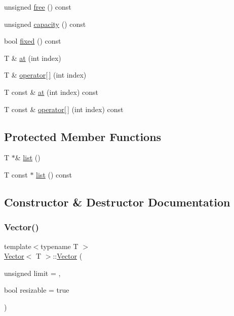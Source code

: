 \begin{DoxyCompactItemize}
unsigned \hyperlink{classVector_a1c11aef701f6eb3194946594d064af09}{free} () const
\item 
unsigned \hyperlink{classVector_a30435b1635ae160705f53755d25a407b}{capacity} () const
\item 
bool \hyperlink{classVector_ada65b076d4102d21479cdb00fec6b6a1}{fixed} () const
\item 
T \& \hyperlink{classVector_a0a53d8de64ae7cc1e388df4e46ab06bf}{at} (int index)
\item 
T \& \hyperlink{classVector_a2054758707c08325ef160fd4dfc48ff7}{operator\mbox{[}$\,$\mbox{]}} (int index)
\item 
T const  \& \hyperlink{classVector_a2539a2d9ca64fd4e400d1bdc23dc292c}{at} (int index) const
\item 
T const  \& \hyperlink{classVector_a491327d90df15af7ee79c6705f005491}{operator\mbox{[}$\,$\mbox{]}} (int index) const
\end{DoxyCompactItemize}
\subsection*{Protected Member Functions}
\begin{DoxyCompactItemize}
\item 
T $\ast$\& \hyperlink{classVector_aad3f85e26470d99139e3f96053bdacc4}{list} ()
\item 
T const  $\ast$ \hyperlink{classVector_a2aaf129778179680e5932d96aa5471eb}{list} () const
\end{DoxyCompactItemize}


\subsection{Constructor \& Destructor Documentation}
\mbox{\label{classVector_a2d2738e562188d3c4e08c3fc7075dc0a}} 
\subsubsection{\texorpdfstring{Vector()}{Vector()}\hspace{0.1cm}{\footnotesize\ttfamily [1/3]}}
{\footnotesize\ttfamily template$<$typename T $>$ \\
\hyperlink{classVector}{Vector}$<$ T $>$\+::\hyperlink{classVector}{Vector} (\begin{DoxyParamCaption}\item[{unsigned}]{limit = {},  }\item[{bool}]{resizable = {\ttfamily true} }\end{DoxyParamCaption})}


